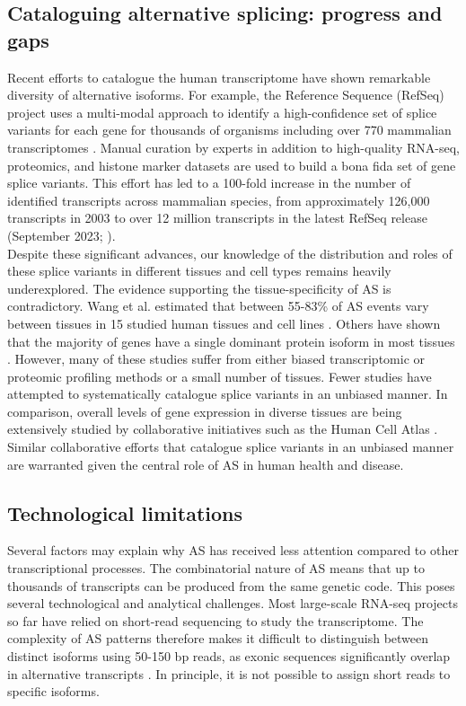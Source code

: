 \subsection{Cataloguing alternative splicing: progress and gaps}
Recent efforts to catalogue the human transcriptome have shown remarkable diversity of alternative isoforms. For example, the Reference Sequence (RefSeq) project uses a multi-modal approach to identify a high-confidence set of splice variants for each gene for thousands of organisms including over 770 mammalian transcriptomes \cite{OLeary2016-ci}. Manual curation by experts in addition to high-quality RNA-seq, proteomics, and histone marker datasets are used to build a bona fida set of gene splice variants. This effort has led to a 100-fold increase in the number of identified transcripts across mammalian species, from approximately 126,000 transcripts in 2003 to over 12 million transcripts in the latest RefSeq release (September 2023; \cite{refseq_ftp}). \\

Despite these significant advances, our knowledge of the distribution and roles of these splice variants in different tissues and cell types remains heavily underexplored. The evidence supporting the tissue-specificity of AS is contradictory. Wang et al. estimated that between 55-83\% of AS events vary between tissues in 15 studied human tissues and cell lines \cite{Wang2008-yg}. Others have shown that the majority of genes have a single dominant protein isoform in most tissues \cite{Ezkurdia2015-iv,Gonzalez-Porta2013-il}. However, many of these studies suffer from either biased transcriptomic or proteomic profiling methods or a small number of tissues. Fewer studies have attempted to systematically catalogue splice variants in an unbiased manner. In comparison, overall levels of gene expression in diverse tissues are being extensively studied by collaborative initiatives such as the Human Cell Atlas \cite{hca_resources}. Similar collaborative efforts that catalogue splice variants in an unbiased manner are warranted given the central role of AS in human health and disease.


\subsection{Technological limitations}
Several factors may explain why AS has received less attention compared to other transcriptional processes. The combinatorial nature of AS means that up to thousands of transcripts can be produced from the same genetic code. This poses several technological and analytical challenges. Most large-scale RNA-seq projects so far have relied on short-read sequencing to study the transcriptome. The complexity of AS patterns therefore makes it difficult to distinguish between distinct isoforms using 50-150 bp reads, as exonic sequences significantly overlap in alternative transcripts \cite{Lacroix2008-wq}. In principle, it is not possible to assign short reads to specific isoforms. \\

